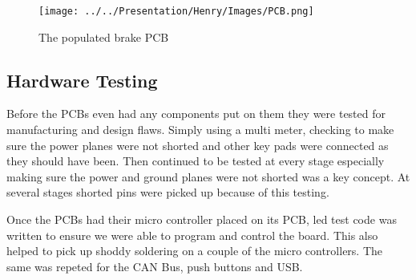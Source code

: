   \begin{figure}[h]
      \centering
      \texttt{[image: ../../Presentation/Henry/Images/PCB.png]}
      \caption{The populated brake PCB}
      \label{fullPCB}
  \end{figure}

  \subsection{Hardware Testing}
  Before the PCBs even had any components put on them they were tested for
  manufacturing and design flaws. Simply using a multi meter, checking to make
  sure the power planes were not shorted and other key pads were connected as
  they should have been. Then continued to be tested at every stage especially
  making sure the power and ground planes were not shorted was a key concept. At
  several stages shorted pins were picked up because of this testing.

  Once the PCBs had their micro controller placed on its PCB, led test code was
  written to ensure we were able to program and control the board. This also
  helped to pick up shoddy soldering on a couple of the micro controllers. The
  same was repeted for the CAN Bus, push buttons and USB.

